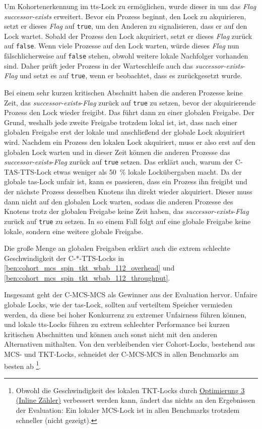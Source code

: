 Um Kohortenerkennung im \gls{tts}-Lock zu ermöglichen,
wurde dieser in \cite{Cohort-Lock} um das \textit{Flag} \textit{successor-exists} erweitert.
Bevor ein Prozess beginnt,
den Lock zu akquirieren,
setzt er dieses \textit{Flag} auf \texttt{true},
um den Anderen zu signalisieren,
dass er auf den Lock wartet.
Sobald der Prozess den Lock akquiriert,
setzt er dieses \textit{Flag} zurück auf \texttt{false}.
Wenn viele Prozesse auf den Lock warten,
würde dieses \textit{Flag} nun fälschlicherweise auf \texttt{false} stehen,
obwohl weitere lokale Nachfolger vorhanden sind.
Daher prüft jeder Prozess in der Warteschleife auch das \textit{successor-exists}-\textit{Flag}
und setzt es auf \texttt{true},
wenn er beobachtet,
dass es zurückgesetzt wurde.

Bei einem sehr kurzen kritischen Abschnitt
haben die anderen Prozesse keine Zeit,
das \textit{successor-exists}-\textit{Flag} zurück auf \texttt{true} zu setzen,
bevor der akquirierende Prozess den Lock wieder freigibt.
Das führt dann zu einer globalen Freigabe.
Der Grund,
weshalb jede zweite Freigabe trotzdem lokal ist,
ist,
dass nach einer globalen Freigabe erst der lokale und anschließend der globale Lock akquiriert wird.
Nachdem ein Prozess den lokalen Lock akquiriert,
muss er also erst auf den globalen Lock warten
und in dieser Zeit können die anderen Prozesse das \textit{successor-exists}-\textit{Flag} zurück auf \texttt{true} setzen.
Das erklärt auch,
warum der C-TAS-TTS-Lock etwas weniger als 50~\% lokale Lockübergaben macht.
Da der globale \gls{tas}-Lock unfair ist,
kann es passieren,
dass ein Prozess ihn freigibt
und der nächste Prozess desselben Knotens ihn direkt wieder akquiriert.
Dieser muss dann nicht auf den globalen Lock warten,
sodass die anderen Prozesse des Knotens
trotz der globalen Freigabe
keine Zeit haben,
das \textit{successor-exists}-\textit{Flag} zurück auf \texttt{true} zu setzen.
In so einem Fall folgt auf eine globale Freigabe keine lokale,
sondern eine weitere globale Freigabe.

Die große Menge an globalen Freigaben
erklärt auch die extrem schlechte Geschwindigkeit der C-*-TTS-Locks
in \autoref{ben:cohort_mcs_spin_tkt_wbab_112_overhead} und \autoref{ben:cohort_mcs_spin_tkt_wbab_112_throughput}.

Insgesamt geht der C-MCS-MCS als Gewinner aus der Evaluation hervor.
Unfaire globale Locks,
wie der \gls{tas}-Lock,
sollten auf verteiltem Speicher vermieden werden,
da diese bei hoher Konkurrenz zu extremer Unfairness führen können,
und lokale \gls{tts}-Locks führen zu extrem schlechter Performance bei kurzen kritischen Abschnitten
und können auch sonst nicht mit den anderen Alternativen mithalten.
Von den verbleibenden vier Cohort-Locks,
bestehend aus MCS- und TKT-Locks,
schneidet der C-MCS-MCS in allen Benchmarks am besten ab
\footnote{%
    Obwohl die Geschwindigkeit des lokalen TKT-Locks durch \hyperref[sec:cohort_opt_3]{Optimierung 3 (Inline Zähler)} verbessert werden kann,
    ändert das nichts an den Ergebnissen der Evaluation:
    Ein lokaler MCS-Lock ist in allen Benchmarks trotzdem schneller (nicht gezeigt).}.

